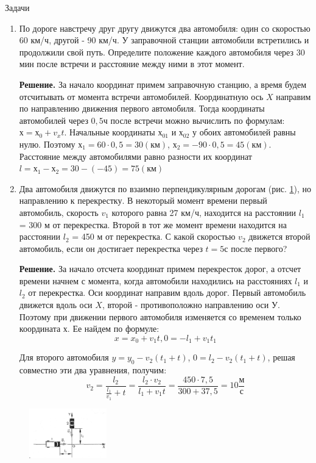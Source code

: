 \documentclass[a5paper, 10pt]{diss_4}
\renewcommand{\'}{\,'}
\begin{document}
\begin{center}
   Задачи
\end{center}
\begin{enumerate}
\item{ По дороге навстречу друг другу движутся два автомобиля: один со скоростью
60 км/ч, другой - 90 км/ч. У заправочной станции автомобили встретились и
продолжили свой путь. Определите положение каждого автомобиля через 30 мин
после встречи и расстояние между ними в этот момент.

 \textbf{Решение.} За начало координат примем заправочную станцию, а время будем
отсчитывать от момента встречи автомобилей. Координатную ось $X$ направим по
направлению движения первого автомобиля. Тогда координаты автомобилей через
$0,5 ч$ после встречи можно вычислить по формулам: $х = х_0 + v_xt$.
Начальные координаты $х_{01}$ и $х_{02}$ у обоих автомобилей равны нулю.
Поэтому $х_1 = 60\cdot 0,5 = 30 (км)$, $х_2 = -90\cdot0,5 = 45 (км)$.
Расстояние между автомобилями равно разности их координат
$l = х_1 - х_2 = 30-(-45) = 75 (км)$
}

 \item{ Два автомобиля движутся по взаимно перпендикулярным дорогам (рис. \ref{fig9}), но
направлению к перекрестку. В некоторый момент времени первый автомобиль,
скорость $v_1$ которого равна 27 км/ч, находится на расстоянии $l_1$ = 300 м
от перекрестка. Второй в тот же момент времени находится на расстоянии $l_2$
= 450 м от перекрестка. С какой скоростью $v_2$ движется второй автомобиль,
если он достигает перекрестка через $t= 5с$ после первого?

\textbf{Решение.} За начало отсчета координат примем перекресток дорог, а отсчет
времени начнем с момента, когда автомобили находились на расстояниях $l_1$ и $l_2$ от
перекрестка. Оси координат направим вдоль дорог. Первый автомобиль движется
вдоль оси $X$, второй - противоположно направлению оси $У$. Поэтому при движении
первого автомобиля изменяется со временем только координата $х$. Ее найдем по
формуле: \[x=x_0+v_1t, 0=-l_1+v_1t_1\]

  Для второго автомобиля $y = y_0 - v_2(t_1 + t)$, $0 = l_2 - v_2(t_1 + t)$,
решая совместно эти два уравнения, получим:
\[
v_2=\frac{l_2}{\frac{l_1}{v_1}+t}=
\frac{l_2\cdot v_2}{l_1+v_1t}=
\frac{450\cdot 7,5}{300+37,5}
=10 \frac{м}{с}
\]
}
\end{enumerate}

\begin{figure}
\begin{center}
\includegraphics[width=0.3\textwidth]{img/img_09.eps}
\caption{}
\end{center}
\label{fig9}
\end{figure}
\end{document}
